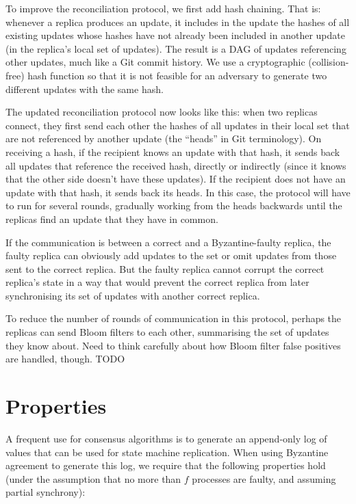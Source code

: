 \documentclass[manuscript]{acmart}
\begin{document}
To improve the reconciliation protocol, we first add hash chaining.
That is: whenever a replica produces an update, it includes in the update the hashes of all existing updates whose hashes have not already been included in another update (in the replica's local set of updates).
The result is a DAG of updates referencing other updates, much like a Git commit history.
We use a cryptographic (collision-free) hash function so that it is not feasible for an adversary to generate two different updates with the same hash.

The updated reconciliation protocol now looks like this: when two replicas connect, they first send each other the hashes of all updates in their local set that are not referenced by another update (the ``heads'' in Git terminology).
On receiving a hash, if the recipient knows an update with that hash, it sends back all updates that reference the received hash, directly or indirectly (since it knows that the other side doesn't have these updates).
If the recipient does not have an update with that hash, it sends back its heads.
In this case, the protocol will have to run for several rounds, gradually working from the heads backwards until the replicas find an update that they have in common.

If the communication is between a correct and a Byzantine-faulty replica, the faulty replica can obviously add updates to the set or omit updates from those sent to the correct replica.
But the faulty replica cannot corrupt the correct replica's state in a way that would prevent the correct replica from later synchronising its set of updates with another correct replica.

To reduce the number of rounds of communication in this protocol, perhaps the replicas can send Bloom filters to each other, summarising the set of updates they know about.
Need to think carefully about how Bloom filter false positives are handled, though. TODO

\section{Properties}

A frequent use for consensus algorithms is to generate an append-only log of values that can be used for state machine replication.
When using Byzantine agreement to generate this log, we require that the following properties hold (under the assumption that no more than $f$ processes are faulty, and assuming partial synchrony):
\end{document}
